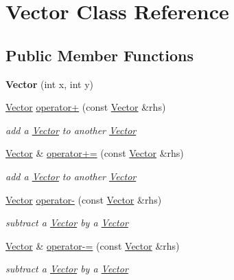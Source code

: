 \hypertarget{class_vector}{}\section{Vector Class Reference}
\label{class_vector}
\subsection*{Public Member Functions}
\begin{DoxyCompactItemize}
\item 
{\bfseries Vector} (int x, int y)\hypertarget{class_vector_a57d2009407d83d9d22f30e27ad32eb46}{}\label{class_vector_a57d2009407d83d9d22f30e27ad32eb46}

\item 
\hyperlink{class_vector}{Vector} \hyperlink{class_vector_aa450d14f63c7348544a70000def8752f}{operator+} (const \hyperlink{class_vector}{Vector} \&rhs)
\begin{DoxyCompactList}\small\item\em add a \hyperlink{class_vector}{Vector} to another \hyperlink{class_vector}{Vector} \end{DoxyCompactList}\item 
\hyperlink{class_vector}{Vector} \& \hyperlink{class_vector_a11ce2f263aa773fd99bb08fba8224b08}{operator+=} (const \hyperlink{class_vector}{Vector} \&rhs)
\begin{DoxyCompactList}\small\item\em add a \hyperlink{class_vector}{Vector} to another \hyperlink{class_vector}{Vector} \end{DoxyCompactList}\item 
\hyperlink{class_vector}{Vector} \hyperlink{class_vector_ad584aa0a56b361429f3da60e0e9934a4}{operator-\/} (const \hyperlink{class_vector}{Vector} \&rhs)
\begin{DoxyCompactList}\small\item\em subtract a \hyperlink{class_vector}{Vector} by a \hyperlink{class_vector}{Vector} \end{DoxyCompactList}\item 
\hyperlink{class_vector}{Vector} \& \hyperlink{class_vector_a7471fa86eabea66f28f54cb3cd667edd}{operator-\/=} (const \hyperlink{class_vector}{Vector} \&rhs)
\begin{DoxyCompactList}\small\item\em subtract a \hyperlink{class_vector}{Vector} by a \hyperlink{class_vector}{Vector} \end{DoxyCompactList}\item 

\end{DoxyCompactItemize}

